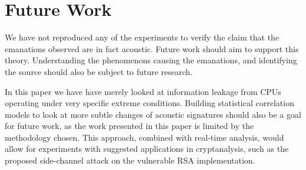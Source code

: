 \section{Future Work}\label{chp7:sec:future_work}
We have not reproduced any of the experiments to verify the claim that the emanations observed are in fact acoustic.
Future work should aim to support this theory.
Understanding the phenomenons causing the emanations, and identifying the source should also be subject to future research.

In this paper we have have merely looked at information leakage from CPUs operating under very specific extreme conditions.
Building statistical correlation models to look at more subtle changes of acoustic signatures should also be a goal for future work, as the work presented in this paper is limited by the methodology chosen.
This approach, combined with real-time analysis, would allow for experiments with suggested applications in cryptanalysis, such as the proposed side-channel attack on the vulnerable RSA implementation.
